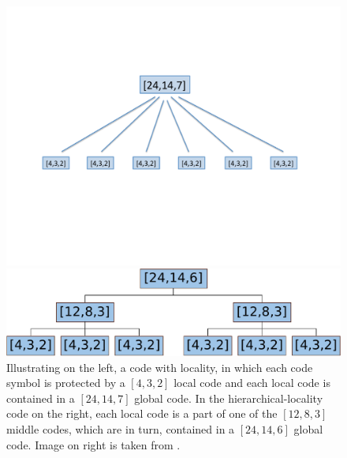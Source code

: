 \begin{figure}[H]
\centering
		\begin{minipage}[b]{0.45\textwidth}
			\includegraphics[scale=.42]{src/Figures/chap4/flat} 
		\end{minipage}
		\hspace*{0.55in}
		\begin{minipage}[b]{0.44\textwidth}
			\includegraphics[scale=.38]{src/Figures/chap4/hierarchical}  
		\end{minipage}
	\caption{Illustrating on the left, a code with locality, in which each code symbol is protected by a $[4,3,2]$ local code and each local code is contained in a $[24,14,7]$ global code. In the hierarchical-locality code on the right, each local code is a part of one of the $[12,8,3]$ middle codes, which are in turn, contained in a $[24,14,6]$ global code. Image on right is taken from \cite{SasAgaKum_loc}.} \label{fig:hierarchical} 
\end{figure}

